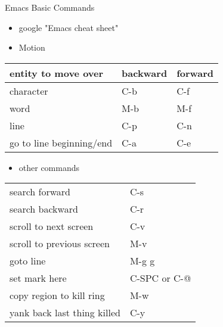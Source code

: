 \documentclass[presentation]{beamer}
\begin{document}
\begin{frame}[label=sec-6]{Emacs Basic Commands}
\begin{itemize}
\item google "\alert{Emacs cheat sheet}"
\item Motion
\end{itemize}
\begin{center}
\begin{tabular}{lll}
\hline
entity to move over & backward & forward\\
\hline
character & C-b & C-f\\
word & M-b & M-f\\
line & C-p & C-n\\
go to line beginning/end & C-a & C-e\\
\hline
\end{tabular}
\end{center}
\begin{itemize}
\item other commands
\end{itemize}
\begin{center}
\begin{tabular}{ll}
\hline
search forward & C-s\\
search backward & C-r\\
scroll to next screen & C-v\\
scroll to previous screen & M-v\\
goto line & M-g g\\
set mark here & C-SPC or C-@\\
copy region to kill ring & M-w\\
yank back last thing killed & C-y\\
\hline
\end{tabular}
\end{center}
\end{frame}
\end{document}
